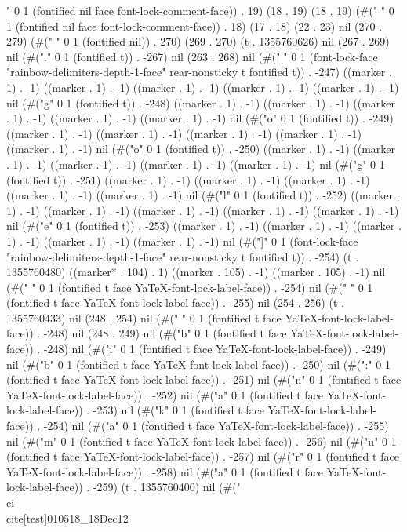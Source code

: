 {" 0 1 (fontified nil face font-lock-comment-face)) . 19) (18 . 19) (18 . 19) (#(" " 0 1 (fontified nil face font-lock-comment-face)) . 18) (17 . 18) (22 . 23) nil (270 . 279) (#(" " 0 1 (fontified nil)) . 270) (269 . 270) (t . 1355760626) nil (267 . 269) nil (#("." 0 1 (fontified t)) . -267) nil (263 . 268) nil (#("[" 0 1 (font-lock-face "rainbow-delimiters-depth-1-face" rear-nonsticky t fontified t)) . -247) ((marker . 1) . -1) ((marker . 1) . -1) ((marker . 1) . -1) ((marker . 1) . -1) ((marker . 1) . -1) nil (#("g" 0 1 (fontified t)) . -248) ((marker . 1) . -1) ((marker . 1) . -1) ((marker . 1) . -1) ((marker . 1) . -1) ((marker . 1) . -1) nil (#("o" 0 1 (fontified t)) . -249) ((marker . 1) . -1) ((marker . 1) . -1) ((marker . 1) . -1) ((marker . 1) . -1) ((marker . 1) . -1) nil (#("o" 0 1 (fontified t)) . -250) ((marker . 1) . -1) ((marker . 1) . -1) ((marker . 1) . -1) ((marker . 1) . -1) ((marker . 1) . -1) nil (#("g" 0 1 (fontified t)) . -251) ((marker . 1) . -1) ((marker . 1) . -1) ((marker . 1) . -1) ((marker . 1) . -1) ((marker . 1) . -1) nil (#("l" 0 1 (fontified t)) . -252) ((marker . 1) . -1) ((marker . 1) . -1) ((marker . 1) . -1) ((marker . 1) . -1) ((marker . 1) . -1) nil (#("e" 0 1 (fontified t)) . -253) ((marker . 1) . -1) ((marker . 1) . -1) ((marker . 1) . -1) ((marker . 1) . -1) ((marker . 1) . -1) nil (#("]" 0 1 (font-lock-face "rainbow-delimiters-depth-1-face" rear-nonsticky t fontified t)) . -254) (t . 1355760480) ((marker* . 104) . 1) ((marker . 105) . -1) ((marker . 105) . -1) nil (#("
" 0 1 (fontified t face YaTeX-font-lock-label-face)) . -254) nil (#(" " 0 1 (fontified t face YaTeX-font-lock-label-face)) . -255) nil (254 . 256) (t . 1355760433) nil (248 . 254) nil (#(" " 0 1 (fontified t face YaTeX-font-lock-label-face)) . -248) nil (248 . 249) nil (#("b" 0 1 (fontified t face YaTeX-font-lock-label-face)) . -248) nil (#("i" 0 1 (fontified t face YaTeX-font-lock-label-face)) . -249) nil (#("b" 0 1 (fontified t face YaTeX-font-lock-label-face)) . -250) nil (#(":" 0 1 (fontified t face YaTeX-font-lock-label-face)) . -251) nil (#("n" 0 1 (fontified t face YaTeX-font-lock-label-face)) . -252) nil (#("a" 0 1 (fontified t face YaTeX-font-lock-label-face)) . -253) nil (#("k" 0 1 (fontified t face YaTeX-font-lock-label-face)) . -254) nil (#("a" 0 1 (fontified t face YaTeX-font-lock-label-face)) . -255) nil (#("m" 0 1 (fontified t face YaTeX-font-lock-label-face)) . -256) nil (#("u" 0 1 (fontified t face YaTeX-font-lock-label-face)) . -257) nil (#("r" 0 1 (fontified t face YaTeX-font-lock-label-face)) . -258) nil (#("a" 0 1 (fontified t face YaTeX-font-lock-label-face)) . -259) (t . 1355760400) nil (#("\\ci{}\\cite[test]{010518_18Dec12}
}
